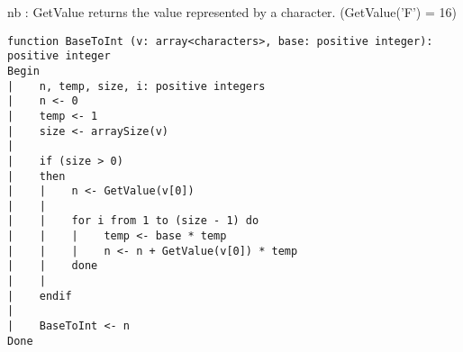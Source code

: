 nb : GetValue returns the value represented by a character. (GetValue('F') = 16)
\begin{lstlisting}
function BaseToInt (v: array<characters>, base: positive integer): positive integer
Begin
|    n, temp, size, i: positive integers
|    n <- 0
|    temp <- 1
|    size <- arraySize(v)
|
|    if (size > 0)
|    then
|    |    n <- GetValue(v[0])
|    |
|    |    for i from 1 to (size - 1) do
|    |    |    temp <- base * temp
|    |    |    n <- n + GetValue(v[0]) * temp
|    |    done
|    |
|    endif
|
|    BaseToInt <- n
Done
\end{lstlisting}

